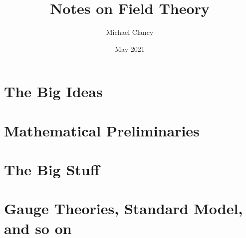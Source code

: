 \documentclass[oneside]{book}
\title{Notes on Field Theory}
\author{Michael Clancy}
\date{May 2021}
\begin{document}
\maketitle
\tableofcontents


\part{The Big Ideas}





\part{Mathematical Preliminaries}






\part{The Big Stuff}










\part{Gauge Theories, Standard Model, and so on}



\end{document}
